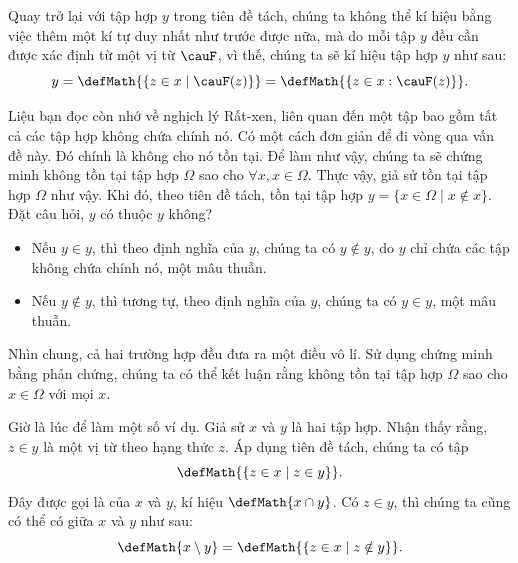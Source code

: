 Quay trở lại với tập hợp $y$ trong tiên đề tách, chúng ta không thể kí hiệu bằng việc thêm một kí tự duy nhất như trước được nữa, mà do mỗi tập $y$ đều cần được xác định từ một vị từ $\cauF$, vì thế, chúng ta sẽ kí hiệu tập hợp $y$ như sau:
\begin{equation*}
    y = \defMath{\{ z \in x \mid \cauF(z) \}} = \defMath{\{ z \in x : \cauF(z) \}}.
\end{equation*}

Liệu bạn đọc còn nhớ về nghịch lý Rất-xen, liên quan đến một tập bao gồm tất cả các tập hợp không chứa chính nó. Có một cách đơn giản để đi vòng qua vấn đề này. Đó chính là không cho nó tồn tại. Để làm như vậy, chúng ta sẽ chứng minh không tồn tại tập hợp $\Omega$ sao cho $\forall x, x \in \Omega$. Thực vậy, giả sử tồn tại tập hợp $\Omega$ như vậy. Khi đó, theo tiên đề tách, tồn tại tập hợp $y = \{x \in \Omega \mid x \notin x \}$. Đặt câu hỏi, $y$ có thuộc $y$ không?
\begin{itemize}
    \item Nếu $y \in y$, thì theo định nghĩa của $y$, chúng ta có $y \notin y$, do $y$ chỉ chứa các tập không chứa chính nó, một mâu thuẫn.
    \item Nếu $y \notin y$, thì tương tự, theo định nghĩa của $y$, chúng ta có $y \in y$, một mâu thuẫn.
\end{itemize}
Nhìn chung, cả hai trường hợp đều đưa ra một điều vô lí. Sử dụng chứng minh bằng phản chứng, chúng ta có thể kết luận rằng không tồn tại tập hợp $\Omega$ sao cho $x \in \Omega$ với mọi $x$.

Giờ là lúc để làm một số ví dụ. Giả sử $x$ và $y$ là hai tập hợp. Nhận thấy rằng, $z \in y$ là một vị từ theo hạng thức $z$. Áp dụng tiên đề tách, chúng ta có tập
\begin{equation*}
    \defMath{\{ z \in x \mid z \in y \}}.
\end{equation*}
Đây được gọi là  của $x$ và $y$, kí hiệu $\defMath{x \cap y}$. Có $z \in y$, thì chúng ta cũng có thể có  giữa $x$ và $y$ như sau:
\begin{equation*}
    \defMath{x \setminus y} = \defMath{\{ z \in x \mid z \notin y \}}.
\end{equation*}